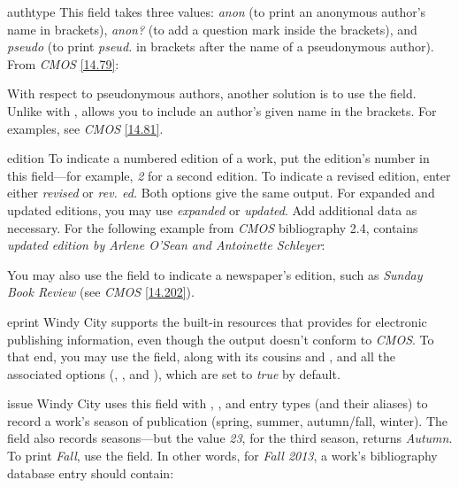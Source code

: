 \documentclass[11pt,letterpaper,oneside]{article}
\begin{document}
\begin{marglist}

\item[authtype] This field takes three values: \textit{anon} (to print
an anonymous author's name in brackets), \textit{anon?} (to add a
question mark inside the brackets), and \textit{pseudo} (to print
\textit{pseud.} in brackets after the name of a pseudonymous author).
From \textit{CMOS} \ref{14.79}:

\begin{citebib}
\item \cite{horsley1796}
\item \cite{hawkes1834}
\end{citebib}

With respect to pseudonymous authors, another solution is to use the
 field. Unlike with ,
 allows you to include an author's given name in
the brackets. For examples, see \textit{CMOS} \ref{14.81}.

\item[edition] To indicate a numbered edition of a work, put the
edition's number in this field---for example, \textit{2} for a second
edition. To indicate a revised edition, enter either \textit{revised}
or \textit{rev. ed.} Both options give the same output. For expanded
and updated editions, you may use \textit{expanded} or
\textit{updated}. Add additional data as necessary. For the following
example from \textit{CMOS} bibliography 2.4, 
contains \textit{updated edition by Arlene O'Sean and Antoinette
Schleyer}:

\begin{bibonly}
\nocite{swanson1999}
\end{bibonly}

\noindent You may also use the field to indicate a newspaper's
edition, such as \textit{Sunday Book Review} (see \textit{CMOS}
\ref{14.202}).

\item[eprint] Windy City supports the built-in resources that
\biblatex provides for electronic publishing information, even though
the output doesn't conform to \textit{CMOS}. To that end, you may use
the  field, along with its cousins
 and , and all the
associated options (, , and ), which are
set to \textit{true} by default.

\item[issue] Windy City uses this field with ,
, and  entry types (and their aliases)
to record a work's season of publication (spring, summer, autumn/fall,
winter). The  field also records seasons---but the value
\textit{23}, for the third season, returns \textit{Autumn}. To print
\textit{Fall}, use the  field. In other words, for
\textit{Fall 2013}, a work's bibliography database entry should
contain:


\end{marglist}
\end{document}
